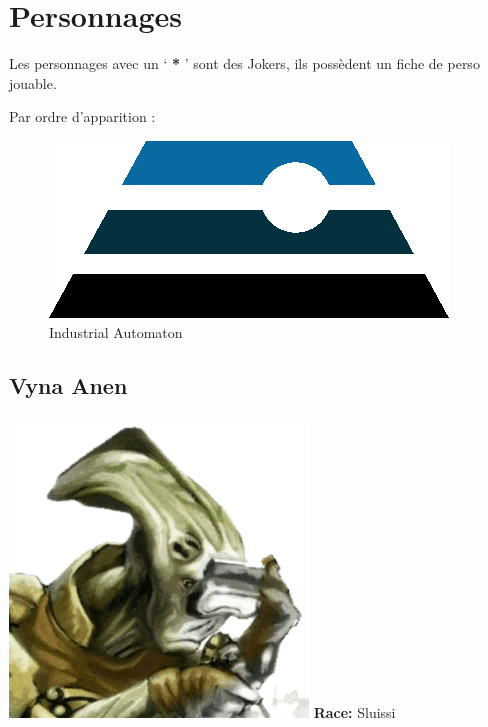 \section{Personnages}
Les personnages avec un ‘ \textbf{*} ’ sont des Jokers, ils possèdent un fiche de perso jouable. 

Par ordre d’apparition :

\begin{figure}[h!]
    \centering
    \includegraphics[width=\linewidth]{_img/industrial-automaton.png}
    \caption{Industrial Automaton}
\end{figure}

\newpage
\subsection{Vyna Anen} \label{sec:vyna-anen}
\noindent\includegraphics[width=\linewidth]{_img/pnjs/vyna-anen.png}
\textbf{Race:} Sluissi

